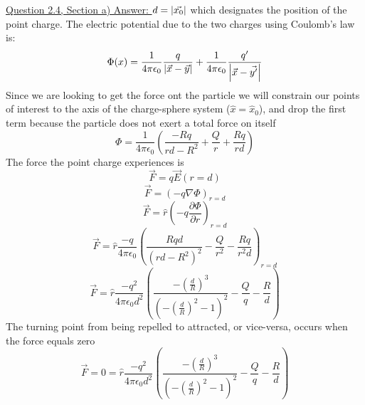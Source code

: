 \documentclass[12pt]{article}
\begin{document}
    \underline{Question 2.4, Section a) Answer: }
    \newline $d=\abs{\vec{x_0}}$ which designates the position of the point charge. 
    \newline The electric potential due to the two charges using Coulomb's law is:
    \begin{equation} \label{eq: 2.1.1}
        \Phi(x) = \frac{1}{4 \pi \epsilon_0} \frac{q}{\abs{\vec{x}-\vec{y}}} + \frac{1}{4 \pi \epsilon_0} \frac{q'}{\abs{\vec{x} - \vec{y'}}}
    \end{equation}
    Since we are looking to get the force ont the particle we will constrain our points of interest to the axis of the charge-sphere system ($\hat{x} = \hat{x}_0$), and drop the first term because the particle does not exert a total force on itself
    \begin{equation} \label{eq: 2.1.2}
        \Phi = \frac{1}{4 \pi \epsilon_0} \left(\frac{-R q}{r d - R^2} + \frac{Q}{r} + \frac{R q}{r d}\right)
    \end{equation}
    The force the point charge experiences is 
    \begin{equation} \label{eq: 2.1.3}
        \vec{F} = q \vec{E}(r=d)
    \end{equation}
    \begin{equation} \label{eq: 2.1.4}
        \vec{F} = (-q \nabla \Phi)_{r=d}
    \end{equation}
    \begin{equation} \label{eq: 2.1.5}
        \vec{F} = \hat{r} \left(-q \frac{\partial \Phi}{\partial r} \right)_{r=d}
    \end{equation}
    \begin{equation} \label{eq: 2.1.6}
        \vec{F} = \hat{r} \frac{-q}{4 \pi \epsilon_0} \left(\frac{R q d}{\left(r d - R^2 \right)^2} - \frac{Q}{r^2} - \frac{R q}{r^2 d} \right)_{r=d}
    \end{equation}
    \begin{equation} \label{eq: 2.1.7}
        \vec{F} = \hat{r} \frac{-q^2}{4 \pi \epsilon_0 d^2} \left(\frac{-\left(\frac{d}{R} \right)^3}{\left(-\left(\frac{d}{R} \right)^2 - 1 \right)^2} - \frac{Q}{q} - \frac{R}{d} \right)
    \end{equation}
    The turning point from being repelled to attracted, or vice-versa, occurs when the force equals zero
    \begin{equation} \label{eq: 2.1.8}
        \vec{F} = 0 = \hat{r} \frac{-q^2}{4 \pi \epsilon_0 d^2} \left(\frac{-\left(\frac{d}{R} \right)^3}{\left(-\left(\frac{d}{R} \right)^2 - 1 \right)^2} - \frac{Q}{q} - \frac{R}{d} \right)
    \end{equation}
\end{document}
